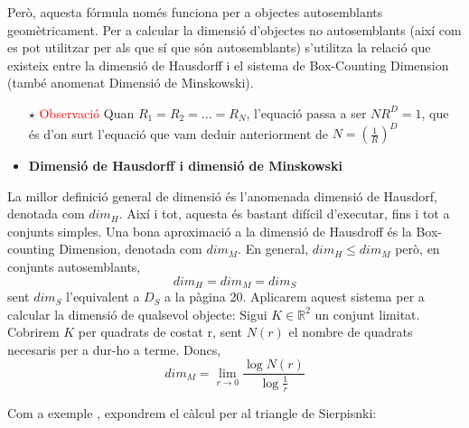 \documentclass[12pt]{report}
\begin{document}
Però, aquesta fórmula només funciona per a objectes autosemblants geomètricament. Per a calcular la dimensió d'objectes no autosemblants (així com es pot utilitzar per als que sí que són autosemblants) s'utilitza la relació que existeix entre la dimensió de Hausdorff i el sistema de Box-Counting Dimension (també anomenat Dimensió de Minskowski).

\begin{itemize}
    \item [$\star$] \textcolor{red}{Observació}
    \newline 
    Quan $R_1 = R_2 = ... = R_N$, l'equació passa a ser $NR^D=1$, que és d'on surt l'equació que vam deduir anteriorment de $N = (\frac{1}{R})^D$
\end{itemize}

\begin{itemize}
\item \textbf{Dimensió de Hausdorff i dimensió de Minskowski }
\end{itemize}
La millor definició general de dimensió és l'anomenada dimensió de Hausdorf, denotada com $dim_H$. Així i tot, aquesta és bastant difícil d'executar, fins i tot a conjunts simples.
\newline
Una bona aproximació a la dimensió de Hausdroff és la Box-counting Dimension, denotada com $dim_M$. En general, $dim_H   \leqslant dim_M$ però, en conjunts autosemblants, 
$$ dim_H = dim_M = dim_S$$
sent $dim_S$ l'equivalent a $D_S$ a la pàgina 20.
\newline
Aplicarem aquest sistema per a calcular la dimensió de qualsevol objecte:
\newline
Sigui $K \in \mathbb{R}^2$ un conjunt limitat. Cobrirem $K$ per quadrats de costat r, sent $N(r)$ el nombre de quadrats necesaris per a dur-ho a terme. Doncs,
$$dim_M=\lim_{r \rightarrow 0}{\frac{\log{N(r)}}{\log{\frac{1}{r}}}}$$

Com a exemple , expondrem el càlcul per al triangle de Sierpisnki:
\end{document}
